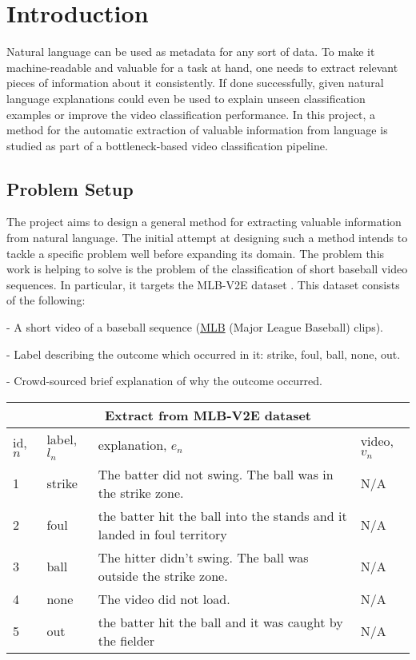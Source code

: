 \chapter{Introduction}

Natural language can be used as metadata for any sort of data.
To make it machine-readable and valuable for a task at hand, one needs to extract relevant pieces of information about it consistently.
If done successfully, given natural language explanations could even be used to explain unseen classification examples or improve the video classification performance.
In this project, a method for the automatic extraction of valuable information from language is studied as part of a bottleneck-based video classification pipeline.





\section{Problem Setup}

The project aims to design a general method for extracting valuable information from natural language.
The initial attempt at designing such a method intends to tackle a specific problem well before expanding its domain.
The problem this work is helping to solve is the problem of the classification of short baseball video sequences.
In particular, it targets the MLB-V2E dataset  \cite{RefWorks:RefID:16-2021automatic}.
This dataset consists of the following:

 - A short video of a baseball sequence (\href{www.mlb.com}{MLB} (Major League Baseball) clips).
 
 - Label describing the outcome which occurred in it: strike, foul, ball, none, out.

 - Crowd-sourced brief explanation of why the outcome occurred.
 
 
\begin{center}
\begin{tabular}{ |p{1.5cm}|p{1.5cm}|p{9cm}|p{1.7cm}|  }
 \hline
 \multicolumn{4}{|c|}{Extract from MLB-V2E dataset} \\
 \hline
 id, $n$ & label, $l_n$ & explanation, $e_n$& video, $v_n$\\
 \hline
 1 & strike & The batter did not swing. The ball was in the strike zone. & N/A \\
 2 & foul & the batter hit the ball into the stands and it landed in foul territory & N/A \\
 3 & ball & The hitter didn’t swing. The ball was outside the strike zone. & N/A \\
 4 & none & The video did not load. & N/A \\
 5 & out & the batter hit the ball and it was caught by the fielder & N/A \\
 
 \hline
\end{tabular}
\end{center}


